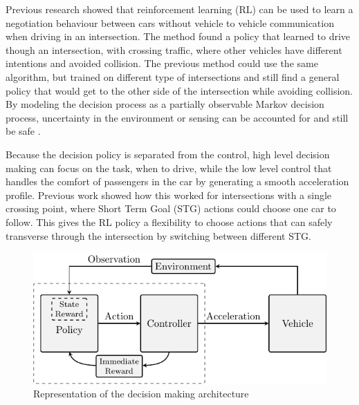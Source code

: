 Previous research \cite{Tram2018LearningQ-Learning} showed that reinforcement learning (RL) can be used to learn a negotiation behaviour between cars without vehicle to vehicle communication when driving in an intersection. The method found a policy that learned to drive though an intersection, with crossing traffic, where other vehicles have different intentions and avoided collision. The previous method could use the same algorithm, but trained on different type of intersections and still find a general policy that would get to the other side of the intersection while avoiding collision. 
By modeling the decision process as a partially observable Markov decision process, uncertainty in the environment or sensing can be accounted for \cite{BrechtelProbabilisticPOMDPs} and still be safe \cite{BoutonReinforcementDriving}. 

Because the decision policy is separated from the control, high level decision making can focus on the task, when to drive, while the low level control that handles the comfort of passengers in the car by generating a smooth acceleration profile. Previous work showed how this worked for intersections with a single crossing point, where Short Term Goal (STG) actions could choose one car to follow. This gives the RL policy a flexibility to choose actions that can safely transverse through the intersection by switching between different STG. %

\begin{figure}[t!]
	\centering
	\vspace{0.3cm}
	\includegraphics[width=0.8\columnwidth]{figures/figures-architecture.pdf}
	\caption{Representation of the decision making architecture}
	\label{fig:Architecture}
	\vspace{-0.3cm}
\end{figure}

